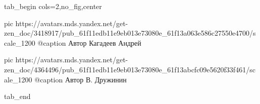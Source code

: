  
 
 
 
 


\ifcmt
  tab_begin cols=2,no_fig,center

     pic https://avatars.mds.yandex.net/get-zen_doc/3418917/pub_61f11edb11e9eb013e73080e_61f13a063e586c27550e4700/scale_1200
		 @caption Автор Кагадеев Андрей

		 pic https://avatars.mds.yandex.net/get-zen_doc/4364496/pub_61f11edb11e9eb013e73080e_61f13abcfc09e5620f33f461/scale_1200
		 @caption Автор В. Дружинин

  tab_end
\fi
